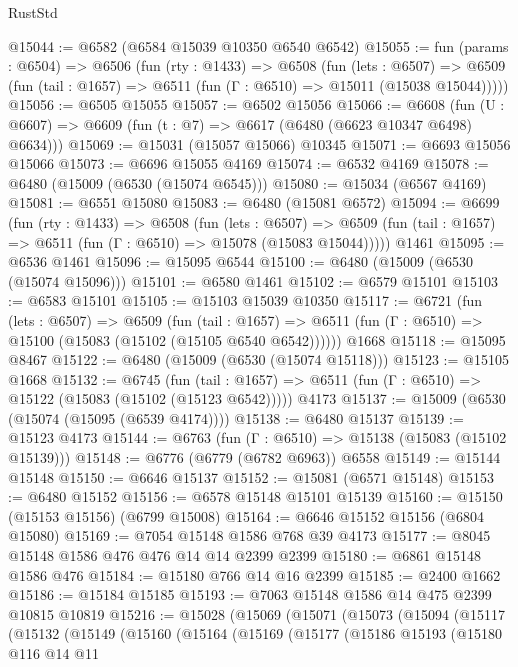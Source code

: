 \begin{lexlean}{RustStd}
\begin{coremodule}
@15044 := @6582 (@6584 @15039 @10350 @6540 @6542)
@15055 := fun (params : @6504) =>
  @6506
    (fun (rty : @1433) =>
    @6508
      (fun (lets : @6507) =>
      @6509 (fun (tail : @1657) => @6511 (fun (Γ : @6510) => @15011 (@15038 @15044)))))
@15056 := @6505 @15055
@15057 := @6502 @15056
@15066 := @6608
    (fun (U : @6607) => @6609 (fun (t : @7) => @6617 (@6480 (@6623 @10347 @6498) @6634)))
@15069 := @15031 (@15057 @15066) @10345
@15071 := @6693 @15056 @15066
@15073 := @6696 @15055 @4169
@15074 := @6532 @4169
@15078 := @6480 (@15009 (@6530 (@15074 @6545)))
@15080 := @15034 (@6567 @4169)
@15081 := @6551 @15080
@15083 := @6480 (@15081 @6572)
@15094 := @6699
    (fun (rty : @1433) =>
    @6508
      (fun (lets : @6507) =>
      @6509 (fun (tail : @1657) => @6511 (fun (Γ : @6510) => @15078 (@15083 @15044)))))
    @1461
@15095 := @6536 @1461
@15096 := @15095 @6544
@15100 := @6480 (@15009 (@6530 (@15074 @15096)))
@15101 := @6580 @1461
@15102 := @6579 @15101
@15103 := @6583 @15101
@15105 := @15103 @15039 @10350
@15117 := @6721
    (fun (lets : @6507) =>
    @6509
      (fun (tail : @1657) =>
      @6511 (fun (Γ : @6510) => @15100 (@15083 (@15102 (@15105 @6540 @6542))))))
    @1668
@15118 := @15095 @8467
@15122 := @6480 (@15009 (@6530 (@15074 @15118)))
@15123 := @15105 @1668
@15132 := @6745
    (fun (tail : @1657) => @6511 (fun (Γ : @6510) => @15122 (@15083 (@15102 (@15123 @6542)))))
    @4173
@15137 := @15009 (@6530 (@15074 (@15095 (@6539 @4174))))
@15138 := @6480 @15137
@15139 := @15123 @4173
@15144 := @6763 (fun (Γ : @6510) => @15138 (@15083 (@15102 @15139)))
@15148 := @6776 (@6779 (@6782 @6963)) @6558
@15149 := @15144 @15148
@15150 := @6646 @15137
@15152 := @15081 (@6571 @15148)
@15153 := @6480 @15152
@15156 := @6578 @15148 @15101 @15139
@15160 := @15150 (@15153 @15156) (@6799 @15008)
@15164 := @6646 @15152 @15156 (@6804 @15080)
@15169 := @7054 @15148 @1586 @768 @39 @4173
@15177 := @8045 @15148 @1586 @476 @476 @14 @14 @2399 @2399
@15180 := @6861 @15148 @1586 @476
@15184 := @15180 @766 @14 @16 @2399
@15185 := @2400 @1662
@15186 := @15184 @15185
@15193 := @7063 @15148 @1586 @14 @475 @2399 @10815 @10819
@15216 := @15028
    (@15069
      (@15071
        (@15073
          (@15094
            (@15117
              (@15132
                (@15149
                  (@15160
                    (@15164
                      (@15169
                        (@15177
                          (@15186
                            @15193
                            (@15180
                              @116
                              @14
                              @11

\end{coremodule}
\end{lexlean}
